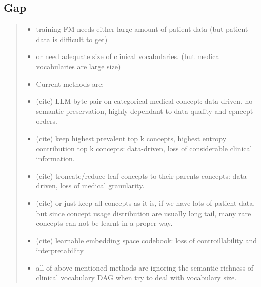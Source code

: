 \subsection{Gap}
\begin{quote}\small\itshape
\begin{itemize}
\item training FM needs either large amount of patient data (but patient data is difficult to get)
\item or need adequate size of clinical vocabularies. (but medical vocabularies are large size)
\item Current methods are:
\item (cite) LLM byte-pair on categorical medical concept: data-driven, no semantic preservation, highly dependant to data quality and cpncept orders.
\item (cite) keep highest prevalent top k concepts, highest entropy contribution top k concepts: data-driven, loss of considerable clinical information.
\item (cite) troncate/reduce leaf concepts to their parents concepts: data-driven, loss of medical granularity.
\item (cite) or just keep all concepts as it is, if we have lots of patient data. but since concept usage distribution are usually long tail, many rare concepts can not be learnt in a proper way.
\item (cite) learnable embedding space codebook: loss of controillability and interpretability
\item all of above mentioned methods are ignoring the semantic richness of clinical vocabulary DAG when try to deal with vocabulary size.
\end{itemize}
\end{quote}
